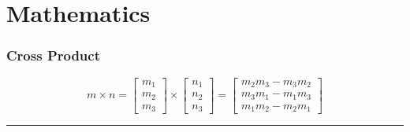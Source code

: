 \section{Mathematics}
\subsubsection{Cross Product}
\[
m \times n =
\begin{bmatrix}
  m_1\\
  m_2\\
  m_3
\end{bmatrix} \times
\begin{bmatrix}
  n_1\\
  n_2\\
  n_3
\end{bmatrix} =
\begin{bmatrix}
  m_2 m_3 - m_3 m_2\\
  m_3 m_1 - m_1 m_3\\
  m_1 m_2 - m_2 m_1
\end{bmatrix}
\]
\hrule
